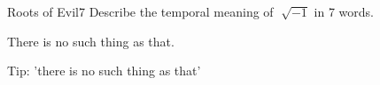 \begin{question}{Roots of Evil}{7}
Describe the temporal meaning of $\sqrt[]{-1}$ in 7 words.

\end{question}

\begin{answer}
There is no such thing as that.
\end{answer}

\begin{hint}
Tip: 'there is no such thing as that'
\end{hint}